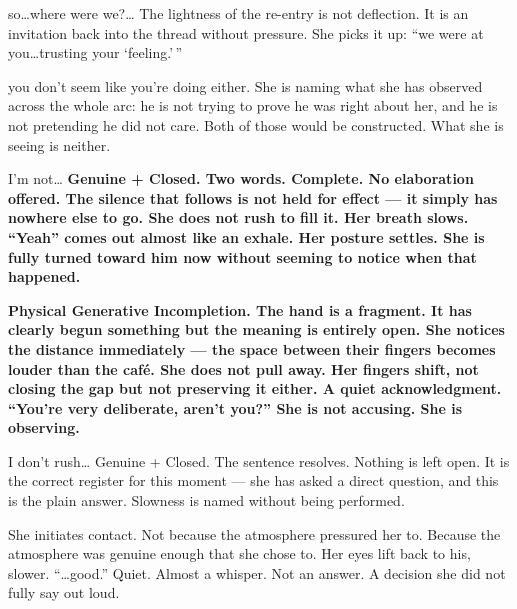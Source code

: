 {so\ldots where were we?\ldots}
{The lightness of the re-entry is not deflection. It is an invitation back into the thread without pressure. She picks it up: ``we were at you\ldots trusting your `feeling.'\,''}

\thinrule

{you don't seem like you're doing either.}
{She is naming what she has observed across the whole arc: he is not trying to prove he was right about her, and he is not pretending he did not care. Both of those would be constructed. What she is seeing is neither.}

{I'm not\ldots}
{\textbf{Genuine + Closed. Two words. Complete. No elaboration offered. The silence that follows is not held for effect --- it simply has nowhere else to go. She does not rush to fill it. Her breath slows. ``Yeah'' comes out almost like an exhale. Her posture settles. She is fully turned toward him now without seeming to notice when that happened.}}

\thinrule

{\textbf{Physical Generative Incompletion. The hand is a fragment. It has clearly begun something but the meaning is entirely open. She notices the distance immediately --- the space between their fingers becomes louder than the café. She does not pull away. Her fingers shift, not closing the gap but not preserving it either. A quiet acknowledgment. ``You're very deliberate, aren't you?'' She is not accusing. She is observing.}}

{I don't rush\ldots}
{Genuine + Closed. The sentence resolves. Nothing is left open. It is the correct register for this moment --- she has asked a direct question, and this is the plain answer. Slowness is named without being performed.}

\thinrule

{She initiates contact. Not because the atmosphere pressured her to. Because the atmosphere was genuine enough that she chose to. Her eyes lift back to his, slower. ``\ldots good.'' Quiet. Almost a whisper. Not an answer. A decision she did not fully say out loud.}

